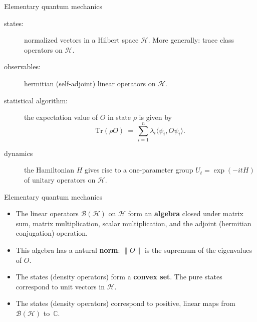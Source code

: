 \documentclass[8pt]{beamer}
\subtitle{from fields to information}
\author{Hans Halvorson}
\date[November 2013]{November 12, 2013} \usetheme{Copenhagen}
\begin{document}
\def\2{\mathcal}
\def\7{\mathbb}
\newenvironment{proenv}{\only{\setbeamercolor{local structure}{fg=green}}}{}
\newenvironment{conenv}{\only{\setbeamercolor{local structure}{fg=red}}}{}  
\newenvironment{neuenv}{\only{\setbeamercolor{local
      structure}{fg=yellow}}}{}

\newcommand{\3}{\mathfrak}

\begin{frame}[plain]
  \titlepage
\end{frame}

\begin{frame}{Elementary quantum mechanics}

\begin{description}

\item[states:] normalized vectors in a Hilbert space $\2H$.
  More generally: trace class operators on $\2H$.

\item[observables:] hermitian (self-adjoint) linear operators
  on $\2H$.

\item[statistical algorithm:] the expectation value of $O$ in state
  $\rho$ is given by 
$$\mathrm{Tr}(\rho O) \: = \: \sum _{i=1}^n\lambda _i\langle \psi _i,O\psi _i\rangle .$$

\item[dynamics] the Hamiltonian $H$ gives rise to a one-parameter
  group $U_t=\exp (-itH)$ of unitary operators on $\2H$.

\end{description}
\end{frame}

\begin{frame}{Elementary quantum mechanics}

  \begin{itemize} 

  \item The linear operators $\2B (\2H)$ on $\2H$ form an
    \textbf{algebra} closed under matrix sum, matrix multiplication,
    scalar multiplication, and the adjoint (hermitian conjugation)
    operation.
  \item This algebra has a natural \textbf{norm}: $\| O\|$ is the
    supremum of the eigenvalues of $O$.
  \item The states (density operators) form a \textbf{convex set}.
    The pure states correspond to unit vectors in $\2H$.
  \item The states (density operators) correspond to positive, linear
    maps from $\2B (\2H)$ to~$\7C$.
\end{itemize}

\end{frame}
\end{document}
